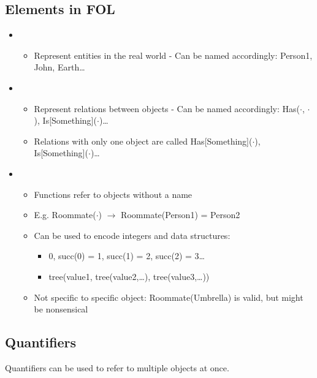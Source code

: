 \documentclass[
../../EiKI_Summary.tex,
]
{subfiles}
\begin{document}
\subsection{Elements in FOL}
\begin{itemize}
    \item {}
    \begin{itemize}
        \item Represent entities in the real world - Can be named accordingly: Person1, John, Earth\dots
    \end{itemize}
    \item {}
    \begin{itemize}
        \item Represent relations between objects - Can be named accordingly: Has($\cdot$, $\cdot$), Is[Something]($\cdot$)\dots
        \item Relations with only one object are called  Has[Something]($\cdot$), Is[Something]($\cdot$)\dots
    \end{itemize}
    \item {}
    \begin{itemize}
        \item Functions refer to objects without a name
        \item E.g. Roommate($\cdot$) $\rightarrow$ Roommate(Person1) = Person2
        \item Can be used to encode integers and data structures:
        \begin{itemize}
            \item 0, succ(0) = 1, succ(1) = 2, succ(2) = 3\dots
            \item tree(value1, tree(value2,\dots), tree(value3,\dots))
        \end{itemize}
        \item Not specific to specific object: Roommate(Umbrella) is valid, but might be nonsensical
    \end{itemize}
\end{itemize}

\subsection{Quantifiers}
Quantifiers can be used to refer to multiple objects at once.
\end{document}
